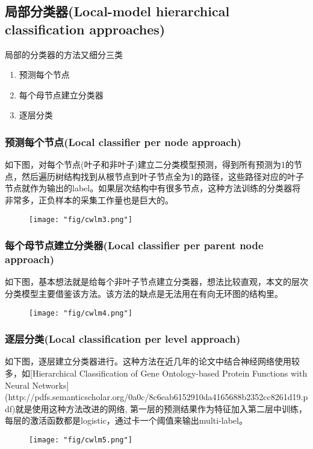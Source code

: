 \subsection{局部分类器(Local-model hierarchical classification approaches)}
局部的分类器的方法又细分三类
\begin{enumerate}
\item 预测每个节点
\item 每个母节点建立分类器
\item 逐层分类
\end{enumerate}

\subsubsection{预测每个节点(Local classifier per node approach)}
如下图，对每个节点(叶子和非叶子)建立二分类模型预测，得到所有预测为1的节点，然后遍历树结构找到从根节点到叶子节点全为1的路径，这些路径对应的叶子节点就作为输出的label。如果层次结构中有很多节点，这种方法训练的分类器将非常多，正负样本的采集工作量也是巨大的。
\begin{figure}[!h]
	\centering
	\texttt{[image: "fig/cwlm3.png"]}
	\caption{}
	\label{fig:cwlm3}
\end{figure}

\subsubsection{每个母节点建立分类器(Local classifier per parent node approach)}
如下图，基本想法就是给每个非叶子节点建立分类器，想法比较直观，本文的层次分类模型主要借鉴该方法。该方法的缺点是无法用在有向无环图的结构里。
\begin{figure}[!h]
	\centering
	\texttt{[image: "fig/cwlm4.png"]}
	\caption{}
	\label{fig:cwlm4}
\end{figure}

\subsubsection{逐层分类(Local classification per level approach)}
如下图，逐层建立分类器进行。这种方法在近几年的论文中结合神经网络使用较多，如[Hierarchical Classification of Gene Ontology-based Protein Functions with Neural Networks](http://pdfs.semanticscholar.org/0a0c/8c6eab6152910da4165688b2352cc8261d19.pdf)就是使用这种方法改进的网络, 第一层的预测结果作为特征加入第二层中训练，每层的激活函数都是logistic，通过卡一个阈值来输出multi-label。
\begin{figure}[!h]
	\centering
	\texttt{[image: "fig/cwlm5.png"]}
	\caption{}
	\label{fig:cwlm5}
\end{figure}

